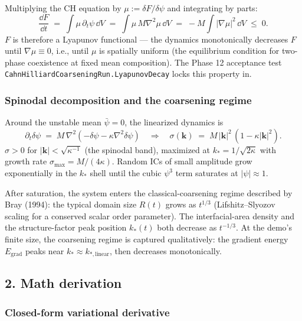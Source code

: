 Multiplying the CH equation by
\(\mu := \delta F/\delta\psi\) and integrating by parts:
\[
\frac{\dd F}{\dd t}
   \;=\; \int \mu\,\partial_t\psi\,\dd V
   \;=\; \int \mu\,M\nabla^2\mu\,\dd V
   \;=\; -M\!\int |\nabla\mu|^2\,\dd V \;\le\; 0.
\]
\(F\) is therefore a Lyapunov functional --- the dynamics monotonically
decreases \(F\) until \(\nabla\mu\equiv 0\), i.e., until \(\mu\) is
spatially uniform (the equilibrium condition for two-phase coexistence
at fixed mean composition). The Phase 12 acceptance test
\passthrough{\lstinline!CahnHilliardCoarseningRun.LyapunovDecay!}
locks this property in.

\subsubsection{Spinodal decomposition and the
coarsening regime}\label{phase12-coarsening}

Around the unstable mean \(\bar\psi=0\), the linearized dynamics is
\[
\partial_t\delta\psi \;=\; M\,\nabla^2(-\delta\psi - \kappa\nabla^2\delta\psi)
\quad\Longrightarrow\quad
\sigma(\mathbf k) \;=\; M\,|\mathbf k|^2\,(1 - \kappa|\mathbf k|^2).
\]
\(\sigma>0\) for \(|\mathbf k|<\sqrt{\kappa^{-1}}\) (the spinodal
band), maximized at
\(k_*=1/\sqrt{2\kappa}\) with growth rate
\(\sigma_{\max}=M/(4\kappa)\). Random ICs of small amplitude grow
exponentially in the \(k_*\) shell until the cubic \(\psi^3\) term
saturates at \(|\psi|\approx 1\).

After saturation, the system enters the classical-coarsening regime
described by Bray (1994): the typical domain size \(R(t)\) grows as
\(t^{1/3}\) (Lifshitz--Slyozov scaling for a conserved scalar order
parameter). The interfacial-area density and the structure-factor
peak position \(k_*(t)\) both decrease as \(t^{-1/3}\). At the demo's
finite size, the coarsening regime is captured qualitatively: the
gradient energy \(E_{\text{grad}}\) peaks near
\(k_*\approx k_{*,\text{linear}}\), then decreases monotonically.

\subsection{2. Math derivation}\label{phase12-math}

\subsubsection{Closed-form variational
derivative}\label{phase12-deriv}

